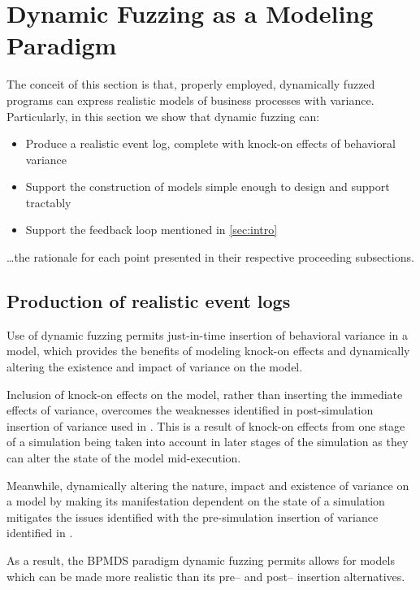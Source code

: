 \documentclass[draft,12pt]{llncs}  %
\begin{document}
\section{Dynamic Fuzzing as a Modeling Paradigm}
\label{sec:dynamic_fuzzing_benefits}
The conceit of this section is that, properly employed, dynamically fuzzed
programs can express realistic models of business processes with variance.
Particularly, in this section we show that dynamic fuzzing can:

\begin{itemize}
\item Produce a realistic event log, complete with knock-on effects of
  behavioral variance
\item Support the construction of models simple enough to design and support
  tractably
\item Support the feedback loop mentioned in \cref{sec:intro}
\end{itemize}

\ldots{}the rationale for each point presented in their respective proceeding
subsections.

\subsection{Production of realistic event logs}
Use of dynamic fuzzing permits just-in-time insertion of behavioral variance in
a model, which provides the benefits of modeling knock-on effects and
dynamically altering the existence and impact of variance on the model.
\par

Inclusion of knock-on effects on the model, rather than inserting the immediate
effects of variance, overcomes the weaknesses identified in post-simulation
insertion of variance used in \cite{accorsi2013secsy}. This is a result of
knock-on effects from one stage of a simulation being taken into account in
later stages of the simulation as they can alter the state of the model
mid-execution.
\par

Meanwhile, dynamically altering the nature, impact and existence of variance on
a model by making its manifestation dependent on the state of a simulation
mitigates the issues identified with the pre-simulation insertion of variance
identified in \cite{pourmasoumi2015business}.
\par

As a result, the BPMDS paradigm dynamic fuzzing permits allows for models which
can be made more realistic than its pre-- and post-- insertion alternatives.
\par
\end{document}
